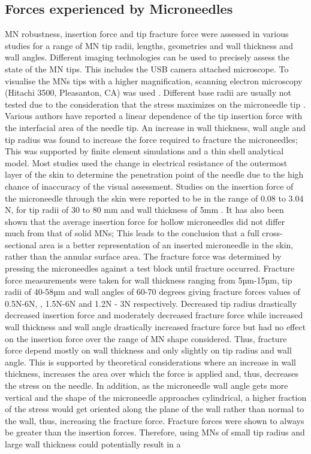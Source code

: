 \begin{appendices}
\subsection{Forces experienced by Microneedles}
MN robustness, insertion force and tip fracture force were assessed in various studies \cite{davis_landis_adams_allen_prausnitz_2004, jung-hwan, römgens_bader_bouwstra_baaijens_oomens_2014} for a range of MN tip radii, lengths, geometries and wall thickness and  wall angles. Different imaging technologies can be used to precisely assess the state of the MN tips. This includes the USB camera attached microscope. To visualise the MNs tips with a higher magnification, scanning electron microscopy (Hitachi 3500, Pleasanton, CA) was used \cite{davis_landis_adams_allen_prausnitz_2004}. Different base radii are usually not tested due to the consideration that the stress maximizes on the microneedle tip \cite{formulas_stress}. Various authors have reported a linear dependence of the tip insertion force with the interfacial area of the needle tip. An increase in wall thickness, wall angle and tip radius was found to increase the force required to fracture the microneedles; This was supported by finite element simulations and a thin shell analytical model. Most studies used the change in electrical resistance of the outermost layer of the skin to determine the penetration point of the needle due to the high chance of inaccuracy of the visual assessment. Studies on the insertion force of the microneedle through the skin were reported to be in the range of 0.08 to 3.04 N,  for tip radii of 30 to 80 mm and wall thickness of 5mm \cite{davis_landis_adams_allen_prausnitz_2004}. It has also been shown that the average insertion force for hollow microneedles did not differ much from that of solid MNs; This leads to the conclusion that a full cross-sectional area is a better representation of an inserted microneedle in the skin, rather than the annular surface area. The fracture force was determined by pressing the microneedles against a test block until fracture occurred. Fracture force measurements were taken for wall thickness ranging from 5µm-15µm, tip radii of 40-58µm and wall angles of 60-70 degrees giving fracture forces values of 0.5N-6N, , 1.5N-6N and 1.2N - 3N respectively. Decreased tip radius drastically decreased insertion force and moderately decreased fracture force while increased wall thickness and wall angle drastically increased fracture force but had no effect on the insertion force over the range of MN shape considered. Thus, fracture force depend mostly on wall thickness and only slightly on tip radius and wall angle. This is supported by theoretical considerations where an increase in wall thickness, increases the area over which the force is applied and, thus, decreases the stress on the needle. In addition, as the microneedle wall angle gets more vertical and the shape of the microneedle approaches cylindrical, a higher fraction of the stress would get oriented along the plane of the wall rather than normal to the wall, thus, increasing the fracture force. Fracture forces were shown to always be greater than the insertion forces. Therefore, using MNs of small tip radius and large wall thickness could potentially result in a 
\end{appendices}
